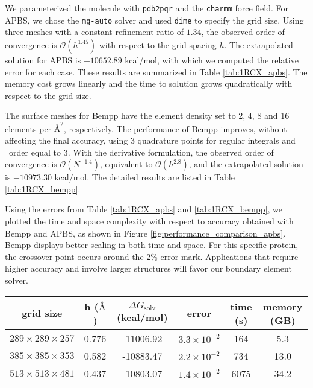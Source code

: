 We parameterized the molecule with \texttt{pdb2pqr} and the \texttt{charmm} force field. 
For APBS, we chose the \texttt{mg-auto} solver and used \texttt{dime} to specify the grid size.
Using three meshes with a constant refinement ratio of $1.34$, the observed order of convergence is $\mathcal{O}(h^{1.45})$ with respect to the grid spacing $h$.
The extrapolated solution for APBS is $-10652.89$ kcal/mol, with which we computed the relative error for each case.
These results are summarized in Table \ref{tab:1RCX_apbs}.
The memory cost grows linearly and the time to solution grows quadratically with respect to the grid size.

The surface meshes for Bempp have the element density set to 2, 4, 8 and 16 elements per $\si{\angstrom}^{2}$, respectively.
The performance of Bempp improves, without affecting the final accuracy, using 3 quadrature points for regular integrals and \fmm\ order equal to 3.
With the derivative formulation, the observed order of convergence is $\mathcal{O}(N^{-1.4})$, equivalent to $\mathcal{O}(h^{2.8})$, and the extrapolated solution is $-10973.30$ kcal/mol.
The detailed results are listed in Table \ref{tab:1RCX_bempp}.

Using the errors from Table \ref{tab:1RCX_apbs} and \ref{tab:1RCX_bempp}, we plotted the time and space complexity with respect to accuracy obtained with Bempp and APBS, as shown in Figure \ref{fig:performance_comparison_apbs}.
Bempp displays better scaling in both time and space.
For this specific protein, the crossover point occurs around the 2\%-error mark.
Applications that require higher accuracy and involve larger structures will favor our boundary element solver.

\begin{table*}[]
    \centering
    \begin{tabular}{cc|cc|cc}
    grid size                   & h ($\si{\angstrom}$) & $\Delta G_{\mathrm{solv}}$ (kcal/mol) & error               & time (s) & memory (GB) \\ \hline
    $289 \times 289 \times 257$ & 0.776                & -11006.92                             & $3.3\times 10^{-2}$ & 164      & 5.3         \\
    $385 \times 385 \times 353$ & 0.582                & -10883.47                             & $2.2\times 10^{-2}$ & 734      & 13.0        \\
    $513 \times 513 \times 481$ & 0.437                & -10803.07                             & $1.4\times 10^{-2}$ & 6075     & 34.2       
    \end{tabular}
    \caption{Results from computing the solvation energy of 1RCX using the \texttt{mg-auto} solver in APBS.
    Error is calculated based on the extrapolated solution $-10652.89$ kcal/mol.}
    \label{tab:1RCX_apbs}
\end{table*}

